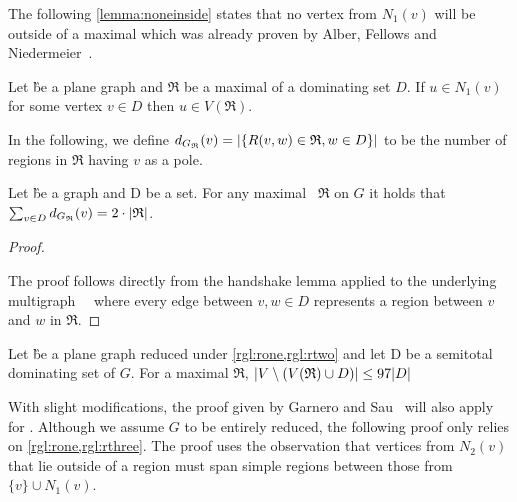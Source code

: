The following \cref{lemma:noneinside} states that no vertex from $N_1(v)$ will be outside of a maximal \dreg which was already proven by {Alber, Fellows and Niedermeier~\cite[Lemma 6]{Alber2004}}.

\begin{lemma}\label{lemma:noneinside}
    Let \G be a plane graph and $\mathfrak{R}$ be a maximal \dreg of a dominating set $D$. If $u \in N_1(v)$ for some vertex $v \in D$ then $u \in V(\mathfrak{R})$.
\end{lemma}

In the following, we define $d_{G_{\mathfrak{R}}}(v) = \abs{\{R(v,w) \in \mathfrak{R}, w \in D\}}$ to be the number of regions in $\mathfrak{R}$ having $v$ as a pole. 

\begin{corollary}
    Let \G be a graph and D be a set. For any maximal \dreg~$\mathfrak{R}$ on $G$ it holds that $\sum_{v \in D} d_{G_{\mathfrak{R}}}(v) = 2 \cdot \abs{\mathfrak{R}}$.
\end{corollary}
\begin{proof}\label{lemma:polesBound}
    
    The proof follows directly from the handshake lemma applied to the underlying multigraph~\GR~ where every edge between $v,w \in D$ represents a region between $v$ and $w$ in $\mathfrak{R}$.
\end{proof}

\begin{proposition}\label{lemma:outside}
    Let \G be a plane graph reduced under \cref*{rgl:rone,rgl:rtwo} and let D be a semitotal dominating set of $G$. For a maximal \dreg $\mathfrak{R}$,  $\abs{V \setminus (V(\mathfrak{R}) \cup D)} \leq 97 \abs{D}$
\end{proposition}

With slight modifications, the proof given by Garnero and Sau~\cite[arXiv v2]{Garnero2018} will also apply for \sdom. Although we assume $G$ to be entirely reduced, the following proof only relies on \cref{rgl:rone,rgl:rthree}. The proof uses the observation that vertices from $N_2(v)$ that lie outside of a region must span simple regions between those from $\{v\} \cup N_1(v)$.

